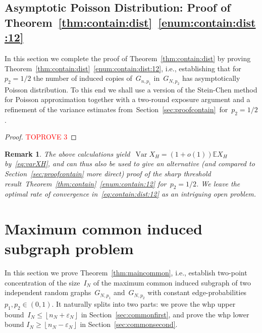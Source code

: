 \documentclass{article}
\newcommand{\eps}{\varepsilon}
\newcommand{\E}{\mathbb{E}}
\newcommand\floor[1]{\left\lfloor #1 \right \rfloor}
\newcommand{\nN}{n_N}
\newcommand\Var{\operatorname{Var}}
\newtheorem{remark}{Remark}
\newcommand{\refT}[1]{Theorem~\ref{#1}}
\newcommand{\refS}[1]{Section~\ref{#1}}
\begin{document}
\subsection{Asymptotic Poisson Distribution: Proof of \refT{thm:contain:dist}~\ref{enum:contain:dist:12}}\label{sec:contain:dist:poisson}
In this section we complete the proof of \refT{thm:contain:dist} by proving \refT{thm:contain:dist}~\ref{enum:contain:dist:12}, i.e., establishing that for~${p_2 =1/2}$ the number of induced copies of~$G_{n,p_1}$ in~$G_{N,p_2}$ has asymptotically Poisson distribution. 
To this end we shall use a version of the Stein-Chen method for Poisson approximation together with a two-round exposure argument and a refinement of the variance estimates from~\refS{sec:proofcontain}~for~${p_2=1/2}$.  
\begin{proof}\textcolor{red}{TOPROVE 3}\end{proof}


\begin{remark}\label{rem:sec:dist:poisson}
The above calculations yield~$\Var X_H =(1+o(1)) \E X_H$ by~\eqref{eq:varXH}, and can thus also be used to give an alternative (and compared to Section~\ref{sec:proofcontain} more direct) proof of the sharp threshold result~\refT{thm:contain}~\ref{enum:contain:12} for~$p_2=1/2$. 
We leave the optimal rate of convergence in~\eqref{eq:contain:dist:12} as an intriguing open problem. 
\end{remark}





\section{Maximum common induced subgraph problem}\label{sec:common}
In this section we prove Theorem~\ref{thm:maincommon}, i.e., establish two-point concentration of the size~$I_N$ of the maximum common induced subgraph of two independent random graphs~$G_{N, p_1}$ and~$G_{N,p_2}$ with constant edge-probabilities~${p_1,p_2 \in (0,1)}$. 
It naturally splits into two parts: 
we prove the whp upper bound~${I_N \le \floor{\nN+\eps_N}}$ in Section~\ref{sec:commonfirst}, 
and prove the whp lower bound ${I_N \ge \floor{\nN-\eps_N}}$ in Section~\ref{sec:commonsecond}. 
\end{document}
